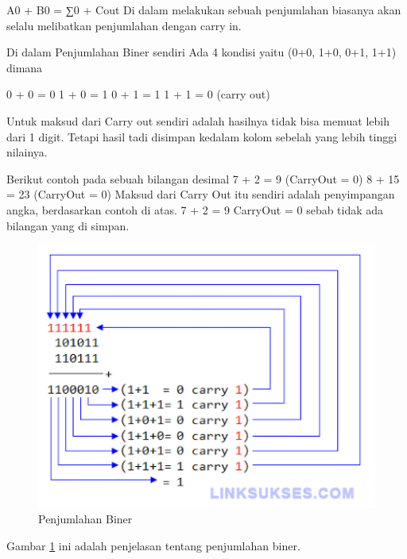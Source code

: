 A0 + B0 = ∑0 + Cout
Di dalam melakukan sebuah penjumlahan biasanya akan selalu melibatkan penjumlahan dengan carry in.

Di dalam Penjumlahan Biner sendiri Ada 4 kondisi yaitu
(0+0, 1+0, 0+1, 1+1) dimana

0 + 0 = 0
1 + 0 = 1
0 + 1 = 1
1 + 1 = 0 (carry out) 

Untuk maksud dari Carry out sendiri adalah hasilnya tidak bisa memuat lebih dari 1 digit. Tetapi  hasil tadi disimpan kedalam kolom sebelah yang lebih tinggi nilainya.

Berikut contoh pada sebuah bilangan desimal
7 + 2 = 9 (CarryOut = 0)
8 + 15 = 23 (CarryOut = 0)
Maksud dari Carry Out itu sendiri adalah penyimpangan angka, berdasarkan contoh di atas. 7 + 2 = 9 CarryOut = 0 sebab tidak ada bilangan yang di simpan. 

	\begin{figure} [ht]
	\centerline{\includegraphics[width=1\textwidth]{figures/Penjumlahan-Biner.gif}}
	\caption{Penjumlahan Biner}
	\label{Penjumlahan-Biner}
	\end{figure}
Gambar \ref{Penjumlahan-Biner} ini adalah penjelasan tentang penjumlahan biner.

